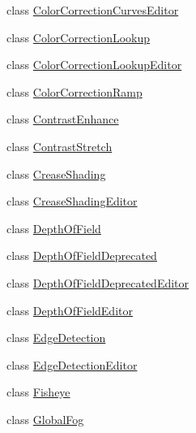 \begin{DoxyCompactItemize}
class \mbox{\hyperlink{class_unity_standard_assets_1_1_image_effects_1_1_color_correction_curves_editor}{Color\+Correction\+Curves\+Editor}}
\item 
class \mbox{\hyperlink{class_unity_standard_assets_1_1_image_effects_1_1_color_correction_lookup}{Color\+Correction\+Lookup}}
\item 
class \mbox{\hyperlink{class_unity_standard_assets_1_1_image_effects_1_1_color_correction_lookup_editor}{Color\+Correction\+Lookup\+Editor}}
\item 
class \mbox{\hyperlink{class_unity_standard_assets_1_1_image_effects_1_1_color_correction_ramp}{Color\+Correction\+Ramp}}
\item 
class \mbox{\hyperlink{class_unity_standard_assets_1_1_image_effects_1_1_contrast_enhance}{Contrast\+Enhance}}
\item 
class \mbox{\hyperlink{class_unity_standard_assets_1_1_image_effects_1_1_contrast_stretch}{Contrast\+Stretch}}
\item 
class \mbox{\hyperlink{class_unity_standard_assets_1_1_image_effects_1_1_crease_shading}{Crease\+Shading}}
\item 
class \mbox{\hyperlink{class_unity_standard_assets_1_1_image_effects_1_1_crease_shading_editor}{Crease\+Shading\+Editor}}
\item 
class \mbox{\hyperlink{class_unity_standard_assets_1_1_image_effects_1_1_depth_of_field}{Depth\+Of\+Field}}
\item 
class \mbox{\hyperlink{class_unity_standard_assets_1_1_image_effects_1_1_depth_of_field_deprecated}{Depth\+Of\+Field\+Deprecated}}
\item 
class \mbox{\hyperlink{class_unity_standard_assets_1_1_image_effects_1_1_depth_of_field_deprecated_editor}{Depth\+Of\+Field\+Deprecated\+Editor}}
\item 
class \mbox{\hyperlink{class_unity_standard_assets_1_1_image_effects_1_1_depth_of_field_editor}{Depth\+Of\+Field\+Editor}}
\item 
class \mbox{\hyperlink{class_unity_standard_assets_1_1_image_effects_1_1_edge_detection}{Edge\+Detection}}
\item 
class \mbox{\hyperlink{class_unity_standard_assets_1_1_image_effects_1_1_edge_detection_editor}{Edge\+Detection\+Editor}}
\item 
class \mbox{\hyperlink{class_unity_standard_assets_1_1_image_effects_1_1_fisheye}{Fisheye}}
\item 
class \mbox{\hyperlink{class_unity_standard_assets_1_1_image_effects_1_1_global_fog}{Global\+Fog}}

\end{DoxyCompactItemize}
